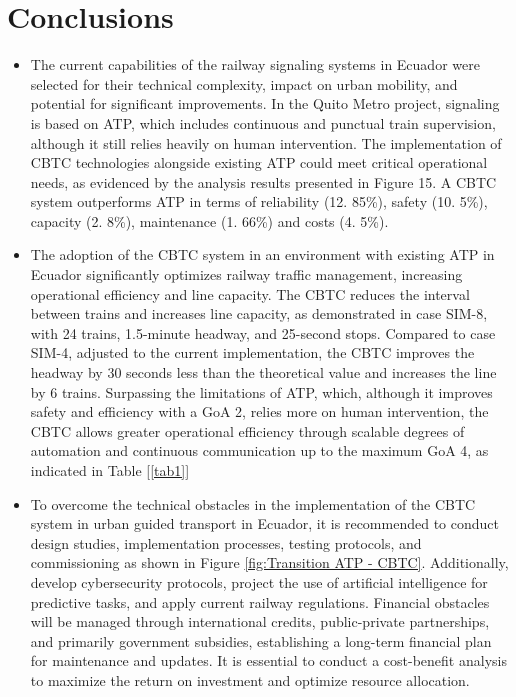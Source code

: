 \documentclass[conference]{IEEEtran}
\begin{document}

\section{Conclusions}
\begin{itemize}
\item The current capabilities of the railway signaling systems in Ecuador were selected for their technical complexity, impact on urban mobility, and potential for significant improvements. In the Quito Metro project, signaling is based on ATP, which includes continuous and punctual train supervision, although it still relies heavily on human intervention. The implementation of CBTC technologies alongside existing ATP could meet critical operational needs, as evidenced by the analysis results presented in Figure 15. A CBTC system outperforms ATP in terms of reliability (12. 85\%), safety (10. 5\%), capacity (2. 8\%), maintenance (1. 66\%) and costs (4. 5\%).\\

\item The adoption of the CBTC system in an environment with existing ATP in Ecuador significantly optimizes railway traffic management, increasing operational efficiency and line capacity. The CBTC reduces the interval between trains and increases line capacity, as demonstrated in case SIM-8, with 24 trains, 1.5-minute headway, and 25-second stops. Compared to case SIM-4, adjusted to the current implementation, the CBTC improves the headway by 30 seconds less than the theoretical value and increases the line by 6 trains. Surpassing the limitations of ATP, which, although it improves safety and efficiency with a GoA 2, relies more on human intervention, the CBTC allows greater operational efficiency through scalable degrees of automation and continuous communication up to the maximum GoA 4, as indicated in Table  [\ref{tab1}]\\

\item To overcome the technical obstacles in the implementation of the CBTC system in urban guided transport in Ecuador, it is recommended to conduct design studies, implementation processes, testing protocols, and commissioning as shown in Figure \ref{fig:Transition ATP - CBTC}. Additionally, develop cybersecurity protocols, project the use of artificial intelligence for predictive tasks, and apply current railway regulations. Financial obstacles will be managed through international credits, public-private partnerships, and primarily government subsidies, establishing a long-term financial plan for maintenance and updates. It is essential to conduct a cost-benefit analysis to maximize the return on investment and optimize resource allocation.
\end{itemize}
\end{document}
